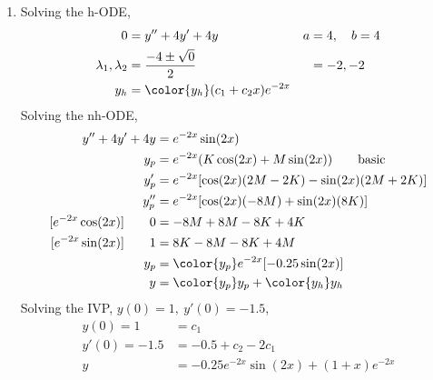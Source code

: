 \begin{enumerate}
    \item Solving the h-ODE,
          \begin{align}
              0                        & = y'' + 4y' + 4y                      & a & = 4, \quad b = 4 \\
              \lambda_{1}, \lambda_{2} & = \frac{-4 \pm \sqrt{0}}{2}           &   & = -2, -2         \\
              y_{h}                    & = \color{y_h} (c_{1} + c_{2}x)e^{-2x}
          \end{align}
          Solving the nh-ODE,
          \begin{align}
              y'' + 4y' + 4y             & = e^{-2x}\sin(2x)                                    \\
              y_{p}                      & = e^{-2x}(K\cos(2x) + M\sin(2x)) \qquad \text{basic} \\
              y_{p}'                     & = e^{-2x}[\cos(2x)(2M - 2K) - \sin(2x)(2M + 2K)]     \\
              y_{p}''                    & = e^{-2x}[\cos(2x)(-8M) + \sin(2x)(8K)]              \\
              [e^{-2x}\cos(2x)] \qquad 0 & =  -8M + 8M - 8K + 4K                                \\
              [e^{-2x}\sin(2x)] \qquad 1 & = 8K - 8M - 8K + 4M                                  \\
              y_{p}                      & = \color{y_p} e^{-2x}[-0.25\sin(2x)]                 \\
              y                          & = {\color{y_p} y_{p}} + {\color{y_h} y_{h}}
          \end{align}
          Solving the IVP, $ y(0) = 1,\ y'(0) = -1.5 $,
          \begin{align}
              y(0) = 1     & = c_{1}                               \\
              y'(0) = -1.5 & = -0.5 + c_{2} - 2c_{1}               \\
              y            & = -0.25e^{-2x}\sin(2x) + (1+x)e^{-2x}
          \end{align}


\end{enumerate}
